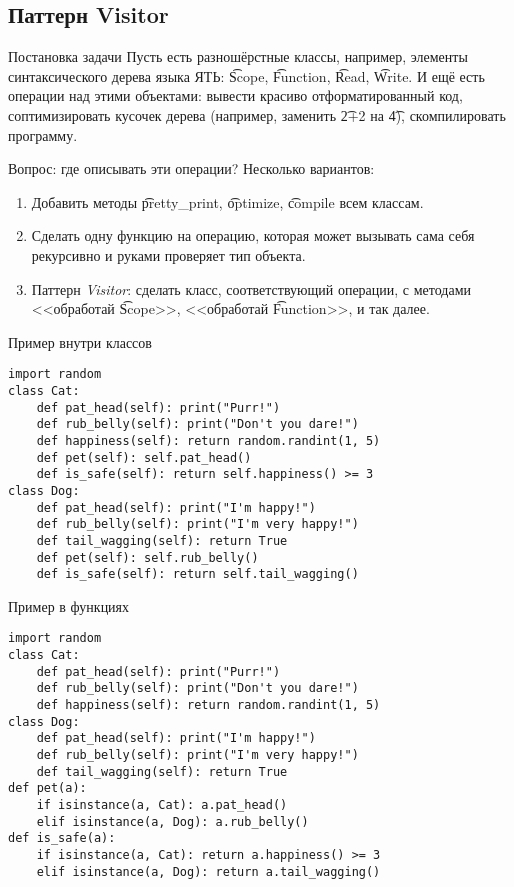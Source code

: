 \subsection{Паттерн Visitor}

\begin{frame}
\end{frame}

\begin{frame}{Постановка задачи}
	Пусть есть разношёрстные классы, например, элементы синтаксического дерева языка ЯТЬ:
	\t{Scope}, \t{Function}, \t{Read}, \t{Write}.
	И ещё есть операции над этими объектами: вывести красиво отформатированный код,
	соптимизировать кусочек дерева (например, заменить \t{2+2} на \t{4}),
	скомпилировать программу.

	Вопрос: где описывать эти операции?
	\pause
	Несколько вариантов:
	\begin{enumerate}
		\item
			Добавить методы \t{pretty\_print}, \t{optimize}, \t{compile} всем классам.
		\item
			Сделать одну функцию на операцию, которая может вызывать сама себя рекурсивно
			и руками проверяет тип объекта.
		\item
			Паттерн \textit{Visitor}: сделать класс, соответствующий операции, с методами
			<<обработай \t{Scope}>>, <<обработай \t{Function}>>, и так далее.
	\end{enumerate}
\end{frame}

\begin{frame}[fragile]{Пример внутри классов}
\begin{verbatim}
import random
class Cat:
    def pat_head(self): print("Purr!")
    def rub_belly(self): print("Don't you dare!")
    def happiness(self): return random.randint(1, 5)
    def pet(self): self.pat_head()
    def is_safe(self): return self.happiness() >= 3
class Dog:
    def pat_head(self): print("I'm happy!")
    def rub_belly(self): print("I'm very happy!")
    def tail_wagging(self): return True
    def pet(self): self.rub_belly()
    def is_safe(self): return self.tail_wagging()
\end{verbatim}
\end{frame}

\begin{frame}[fragile]{Пример в функциях}
\begin{verbatim}
import random
class Cat:
    def pat_head(self): print("Purr!")
    def rub_belly(self): print("Don't you dare!")
    def happiness(self): return random.randint(1, 5)
class Dog:
    def pat_head(self): print("I'm happy!")
    def rub_belly(self): print("I'm very happy!")
    def tail_wagging(self): return True
def pet(a):
    if isinstance(a, Cat): a.pat_head()
    elif isinstance(a, Dog): a.rub_belly()
def is_safe(a):
    if isinstance(a, Cat): return a.happiness() >= 3
    elif isinstance(a, Dog): return a.tail_wagging()
\end{verbatim}
\end{frame}

